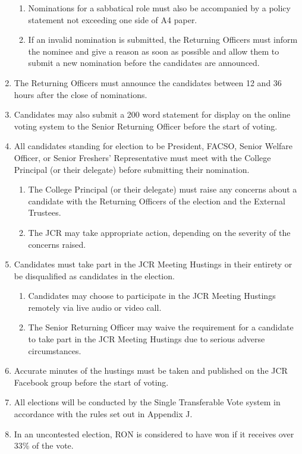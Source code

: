 \documentclass[12pt]{article}
\begin{document}
\begin{enumerate}
\begin{enumerate}
        \item Nominations for a sabbatical role must also be accompanied by a policy statement not exceeding one side of A4 paper.
        \item If an invalid nomination is submitted, the Returning Officers must inform the nominee and give a reason as soon as possible and allow them to submit a new nomination before the candidates are announced.
    \end{enumerate}
    \item The Returning Officers must announce the candidates between 12 and 36 hours after the close of nominations.
    \item Candidates may also submit a 200 word statement for display on the online voting system to the Senior Returning Officer before the start of voting.
    \item All candidates standing for election to be President, FACSO, Senior Welfare Officer, or Senior Freshers' Representative must meet with the College Principal (or their delegate) before submitting their nomination.
    \begin{enumerate}
        \item The College Principal (or their delegate) must raise any concerns about a candidate with the Returning Officers of the election and the External Trustees.
        \item The JCR may take appropriate action, depending on the severity of the concerns raised.
    \end{enumerate}
    \item Candidates must take part in the JCR Meeting Hustings in their entirety or be disqualified as candidates in the election.
    \begin{enumerate}
        \item Candidates may choose to participate in the JCR Meeting Hustings remotely via live audio or video call.
        \item The Senior Returning Officer may waive the requirement for a candidate to take part in the JCR Meeting Hustings  due to serious adverse circumstances.
    \end{enumerate}
    \item Accurate minutes of the hustings must be taken and published on the JCR Facebook group before the start of voting.
    \item All elections will be conducted by the Single Transferable Vote system in accordance with the rules set out in Appendix J.
    \item In an uncontested election, RON is considered to have won if it receives over 33\% of the vote.

\end{enumerate}
\end{document}
